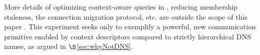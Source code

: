 More details of optimizing context-aware queries in \auspice, reducing membership staleness, the connection migration protocol, etc. are outside the scope of this paper \cite{msocketTR}. This experiment seeks only to exemplify a powerful, new communication primitive enabled by context descriptors compared to strictly hierarchical DNS names, as argued in $\S$\ref{sec:whyNotDNS}. 














